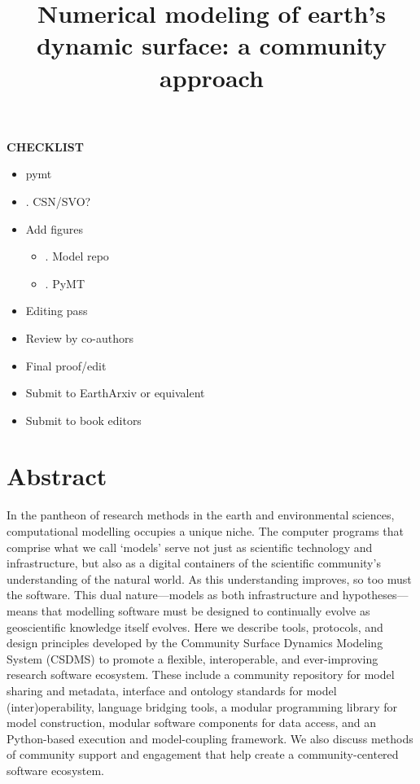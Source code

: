 \documentclass[12pt]{amsart}
\title{Numerical modeling of earth's dynamic surface: a community approach}
\author{}
\date{} %
\begin{document}
\maketitle




\textbf{CHECKLIST}
\begin{itemize}
    \item pymt
    \item . CSN/SVO?
    \item Add figures
    \begin{itemize}
        \item . Model repo
        \item . PyMT
    \end{itemize}
    \item Editing pass
    \item Review by co-authors
    \item Final proof/edit
    \item Submit to EarthArxiv or equivalent
    \item Submit to book editors
\end{itemize}



\section*{Abstract}

In the pantheon of research methods in the earth and environmental sciences, computational modelling occupies a unique niche. The computer programs that comprise what we call `models' serve not just as scientific technology and infrastructure, but also as a digital containers of the scientific community's understanding of the natural world. As this understanding improves, so too must the software. This dual nature---models as both infrastructure and hypotheses---means that modelling software must be designed to continually evolve as geoscientific knowledge itself evolves. Here we describe tools, protocols, and design principles developed by the Community Surface Dynamics Modeling System (CSDMS) to promote a flexible, interoperable, and ever-improving research software ecosystem. These include a community repository for model sharing and metadata, interface and ontology standards for model (inter)operability, language bridging tools, a modular programming library for model construction, modular software components for data access, and an Python-based execution and model-coupling framework. We also discuss methods of community support and engagement that help create a community-centered software ecosystem.
\end{document}
